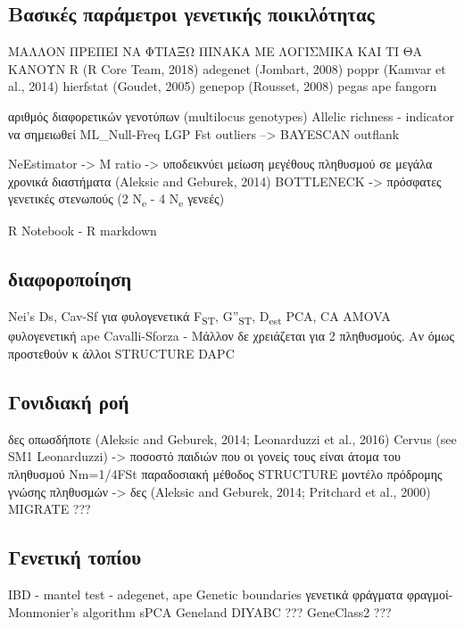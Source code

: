 \documentclass[12pt,a4paper,]{report}
\begin{document}
\hypertarget{---}{%
\subsection{Βασικές παράμετροι γενετικής ποικιλότητας}\label{---}}

ΜΑΛΛΟΝ ΠΡΕΠΕΙ ΝΑ ΦΤΙΑΞΩ ΠΙΝΑΚΑ ΜΕ ΛΟΓΙΣΜΙΚΑ ΚΑΙ ΤΙ ΘΑ ΚΑΝΟΥΝ R (R Core
Team, 2018) adegenet (Jombart, 2008) poppr (Kamvar et al., 2014)
hierfstat (Goudet, 2005) genepop (Rousset, 2008) pegas ape fangorn

αριθμός διαφορετικών γενοτύπων (multilocus genotypes) Allelic richness -
indicator να σημειωθεί ML\_Null-Freq LGP Fst outliers --\textgreater{}
BAYESCAN outflank

NeEstimator -\textgreater{} M ratio -\textgreater{} υποδεικνύει μείωση
μεγέθους πληθυσμού σε μεγάλα χρονικά διαστήματα (Aleksic and Geburek,
2014) BOTTLENECK -\textgreater{} πρόσφατες γενετικές στενωπούς (2
N\textsubscript{e} - 4 N\textsubscript{e} γενεές)

R Notebook - R markdown

\subsection{διαφοροποίηση}

Nei's Ds, Cav-Sf για φυλογενετικά F\textsubscript{ST},
G''\textsubscript{ST}, D\textsubscript{est} PCA, CA AMOVA φυλογενετική
ape Cavalli-Sforza - Μάλλον δε χρειάζεται για 2 πληθυσμούς. Αν όμως
προστεθούν κ άλλοι STRUCTURE DAPC

\hypertarget{-}{%
\subsection{Γονιδιακή ροή}\label{-}}

δες οπωσδήποτε (Aleksic and Geburek, 2014; Leonarduzzi et al., 2016)
Cervus (see SM1 Leonarduzzi) -\textgreater{} ποσοστό παιδιών που οι
γονείς τους είναι άτομα του πληθυσμού Nm=1/4FSt παραδοσιακή μέθοδος
STRUCTURE μοντέλο πρόδρομης γνώσης πληθυσμών -\textgreater{} δες
(Aleksic and Geburek, 2014; Pritchard et al., 2000) MIGRATE ???

\hypertarget{-}{%
\subsection{Γενετική τοπίου}\label{-}}

IBD - mantel test - adegenet, ape Genetic boundaries γενετικά φράγματα
φραγμοί- Monmonier's algorithm sPCA Geneland DIYABC ??? GeneClass2 ???
\end{document}
